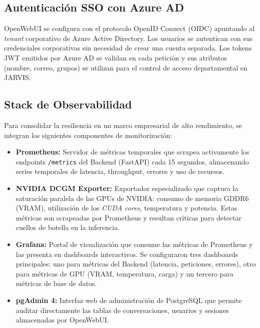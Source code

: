 \subsection{Autenticación SSO con Azure AD}
OpenWebUI se configura con el protocolo OpenID Connect (OIDC) apuntando al \textit{tenant} corporativo de Azure Active Directory. Los usuarios se autentican con sus credenciales corporativas sin necesidad de crear una cuenta separada. Los tokens JWT emitidos por Azure AD se validan en cada petición y sus atributos (nombre, correo, grupos) se utilizan para el control de acceso departamental en JARVIS.

\subsection{Stack de Observabilidad}
Para consolidar la resiliencia en un marco empresarial de alto rendimiento, se integran los siguientes componentes de monitorización:

\begin{itemize}
    \item \textbf{Prometheus:} Servidor de métricas temporales que scrapea activamente los endpoints \texttt{/metrics} del Backend (FastAPI) cada 15 segundos, almacenando series temporales de latencia, throughput, errores y uso de recursos.

    \item \textbf{NVIDIA DCGM Exporter:} Exportador especializado que captura la saturación paralela de las GPUs de NVIDIA: consumo de memoria GDDR6 (VRAM), utilización de los \textit{CUDA cores}, temperatura y potencia. Estas métricas son scrapeadas por Prometheus y resultan críticas para detectar cuellos de botella en la inferencia.

    \item \textbf{Grafana:} Portal de visualización que consume las métricas de Prometheus y las presenta en dashboards interactivos. Se configuraron tres dashboards principales: uno para métricas del Backend (latencia, peticiones, errores), otro para métricas de GPU (VRAM, temperatura, carga) y un tercero para métricas de base de datos.

    \item \textbf{pgAdmin 4:} Interfaz web de administración de PostgreSQL que permite auditar directamente las tablas de conversaciones, usuarios y sesiones almacenadas por OpenWebUI.
\end{itemize}
